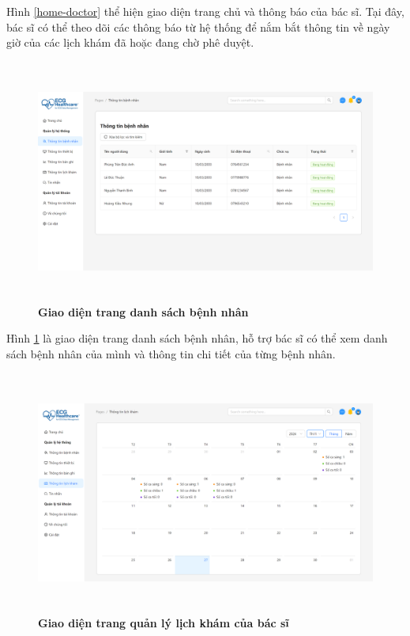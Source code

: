 Hình \ref{home-doctor} thể hiện giao diện trang chủ và thông báo của bác sĩ. Tại đây, bác sĩ có thể theo dõi các thông báo từ hệ thống để nắm bắt thông tin về ngày giờ của các lịch khám đã hoặc đang chờ phê duyệt.

\begin{figure}[H]
	\centering
	\includegraphics[width=15cm,height=8cm]{Images/doctor_ui/patient-list.png}
	\caption[Giao diện trang danh sách bệnh nhân]{\bfseries \fontsize{12pt}{0pt}\selectfont Giao diện trang danh sách bệnh nhân}
	\label{patient-list}
\end{figure}

Hình \ref{patient-list} là giao diện trang danh sách bệnh nhân, hỗ trợ bác sĩ có thể xem danh sách bệnh nhân của mình và thông tin chi tiết của từng bệnh nhân.

\begin{figure}[H]
	\centering
	\includegraphics[width=15cm,height=8cm]{Images/doctor_ui/schedule.png}
	\caption[Giao diện trang quản lý lịch khám của bác sĩ]{\bfseries \fontsize{12pt}{0pt}\selectfont Giao diện trang quản lý lịch khám của bác sĩ}
	\label{schdule-doctor}
\end{figure}

